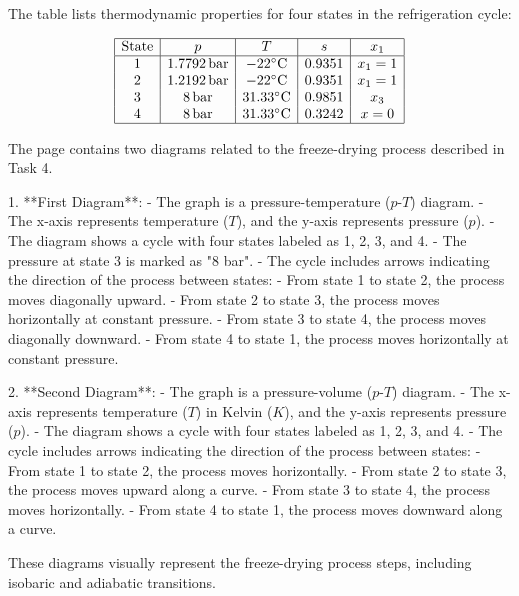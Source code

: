 The table lists thermodynamic properties for four states in the refrigeration cycle:  

\[
\begin{array}{|c|c|c|c|c|}
\hline
\text{State} & p & T & s & x_1 \\
\hline
1 & 1.7792 \, \text{bar} & -22^\circ\text{C} & 0.9351 & x_1 = 1 \\
2 & 1.2192 \, \text{bar} & -22^\circ\text{C} & 0.9351 & x_1 = 1 \\
3 & 8 \, \text{bar} & 31.33^\circ\text{C} & 0.9851 & x_3 \\
4 & 8 \, \text{bar} & 31.33^\circ\text{C} & 0.3242 & x = 0 \\
\hline
\end{array}
\]

The page contains two diagrams related to the freeze-drying process described in Task 4.

1. **First Diagram**:  
   - The graph is a pressure-temperature (\( p \)-\( T \)) diagram.  
   - The x-axis represents temperature (\( T \)), and the y-axis represents pressure (\( p \)).  
   - The diagram shows a cycle with four states labeled as 1, 2, 3, and 4.  
   - The pressure at state 3 is marked as "8 bar".  
   - The cycle includes arrows indicating the direction of the process between states:  
     - From state 1 to state 2, the process moves diagonally upward.  
     - From state 2 to state 3, the process moves horizontally at constant pressure.  
     - From state 3 to state 4, the process moves diagonally downward.  
     - From state 4 to state 1, the process moves horizontally at constant pressure.  

2. **Second Diagram**:  
   - The graph is a pressure-volume (\( p \)-\( T \)) diagram.  
   - The x-axis represents temperature (\( T \)) in Kelvin (\( K \)), and the y-axis represents pressure (\( p \)).  
   - The diagram shows a cycle with four states labeled as 1, 2, 3, and 4.  
   - The cycle includes arrows indicating the direction of the process between states:  
     - From state 1 to state 2, the process moves horizontally.  
     - From state 2 to state 3, the process moves upward along a curve.  
     - From state 3 to state 4, the process moves horizontally.  
     - From state 4 to state 1, the process moves downward along a curve.  

These diagrams visually represent the freeze-drying process steps, including isobaric and adiabatic transitions.